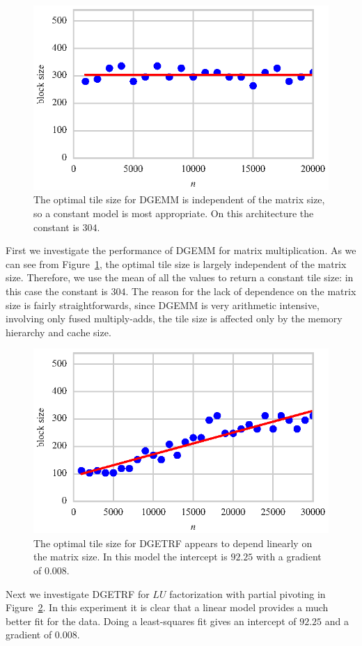 \documentclass[a4paper,12pt]{article}
\begin{document}
\begin{figure}[ht]
  \centering
  \includegraphics[scale=1]{fig/curvefit_const.eps}
  \caption{The optimal tile size for DGEMM is independent of the
    matrix size, so a constant model is most appropriate.
    On this architecture the constant is $304$.}
  \label{fig.fit_const}
\end{figure}
First we investigate the performance of DGEMM
for matrix multiplication.
As we can see from Figure~\ref{fig.fit_const},
the optimal tile size is largely independent of the matrix size.
Therefore, we use the mean of all the values to return a constant
tile size:
in this case the constant is $304$.
The reason for the lack of dependence on the matrix size is
fairly straightforwards,
since DGEMM is very arithmetic intensive,
involving only fused multiply-adds,
the tile size is affected only by the memory hierarchy
and cache size.

\begin{figure}[ht]
  \centering
  \includegraphics[scale=1]{fig/curvefit_linear.eps}
  \caption{The optimal tile size for DGETRF appears to depend
    linearly on the matrix size. In this model the intercept is
    $92.25$ with a gradient of $0.008$.}
  \label{fig.fit_linear}
\end{figure}
Next we investigate DGETRF for $LU$ factorization
with partial pivoting in Figure~\ref{fig.fit_linear}.
In this experiment it is clear that a linear model
provides a much better fit for the data.
Doing a least-squares fit gives an intercept of $92.25$
and a gradient of $0.008$.
\end{document}

